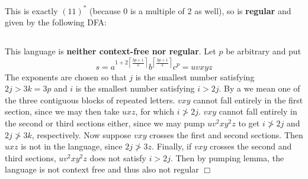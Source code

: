 \documentclass{article}
\begin{document}
\subsection{}
This is exactly $(11)^*$ (because 0 is a multiple of 2 as well), so is \textbf{regular} and given by the following DFA:


\subsection{}
This language is \textbf{neither context-free nor regular}. Let $p$ be arbitrary and put
$$s = a^{1+2\left\lceil \frac{3p+1}{2} \right\rceil}b^{\left\lceil \frac{3p+1}{2} \right\rceil}c^p = uvxyz$$
The exponents are chosen so that $j$ is the smallest number satisfying $2j > 3k = 3p$ and $i$ is the smallest number satisfying $i > 2j$. By a  we mean one of the three contiguous blocks of repeated letters. $vxy$ cannot fall entirely in the first section, since we may then take $uxz$, for which $i \not> 2j$. $vxy$ cannot fall entirely in the second or third sections either, since we may pump $uv^2xy^2z$ to get $i \not> 2j$ and $2j \not> 3k$, respectively. Now suppose $vxy$ crosses the first and second sections. Then $uxz$ is not in the language, since $2j \not> 3z$. Finally, if $vxy$ crosses the second and third sections, $uv^2xy^2z$ does not satisfy $i > 2j$. Then by pumping lemma, the language is not context free and thus also not regular $\Box$
\end{document}
